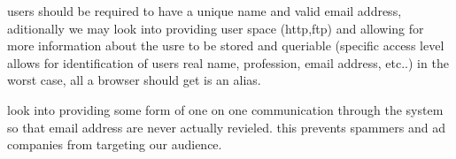 users should be required to have a unique name and valid email address, aditionally we may look into providing user space (http,ftp) and allowing for more information about the usre to be stored and queriable (specific access level allows for identification of users real name, profession, email address, etc..) in the worst case, all a browser should get is an alias.

look into providing some form of one on one communication through the system so that email address are never actually revieled. this prevents spammers and ad companies from targeting our audience.
